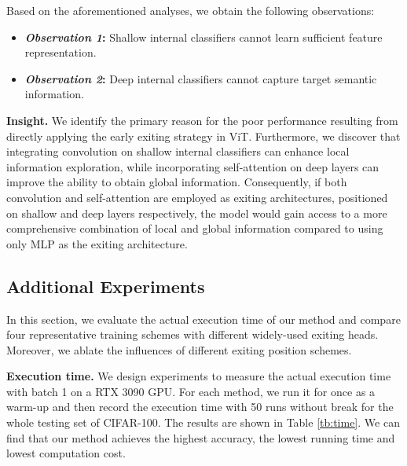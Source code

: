 Based on the aforementioned analyses, we obtain the following observations: 
\begin{itemize}
    \item \textbf{\textit{Observation 1}:} Shallow internal classifiers cannot learn sufficient feature representation. 
    \item \textbf{\textit{Observation 2}:} Deep internal classifiers cannot capture target semantic information. 
  \end{itemize}

\textbf{Insight.} 
We identify the primary reason for the poor performance resulting from directly applying the early exiting strategy in ViT. 
Furthermore, we discover that integrating convolution on shallow internal classifiers can enhance local information exploration, 
while incorporating self-attention on deep layers can improve the ability to obtain global information. 
Consequently, if both convolution and self-attention are employed as exiting architectures, positioned on shallow and deep layers respectively, 
the model would gain access to a more comprehensive combination of local and global information compared to using only MLP as the exiting architecture. 









\subsection{Additional Experiments}
\label{sc:append_ex}

In this section, we evaluate the actual execution time of our method and compare four representative training schemes with different widely-used exiting heads. 
Moreover, we ablate the influences of different exiting position schemes. 

\textbf{Execution time.} We design experiments to measure the actual execution time with batch 1 on a RTX 3090 GPU. 
For each method, we run it for once as a warm-up and then record the execution time with 50 runs without break for the whole testing set of CIFAR-100. 
The results are shown in Table \ref{tb:time}. We can find that our method achieves the highest accuracy, the lowest running time and lowest computation cost. 

